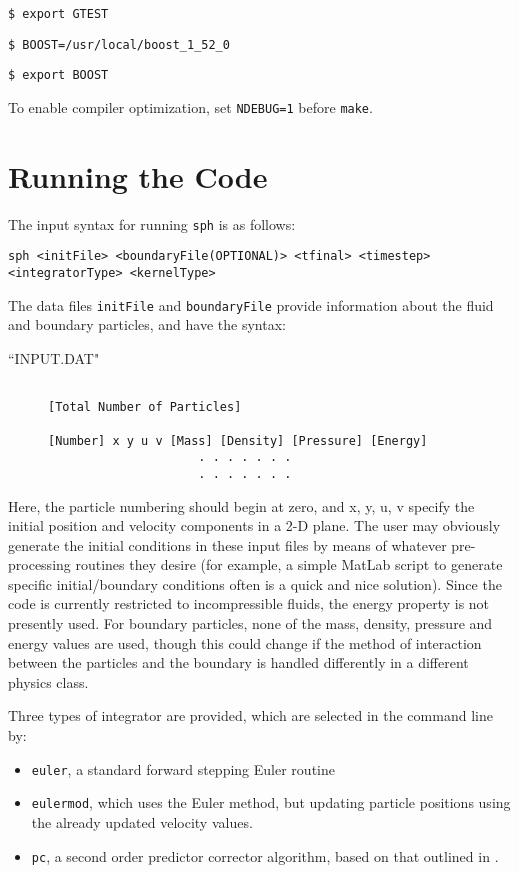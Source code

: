 \documentclass[12pt]{article}
\begin{document}
\texttt{\$  export GTEST}
  
\texttt{\$  BOOST=/usr/local/boost\_1\_52\_0}

\texttt{\$ export BOOST}

\noindent
To enable compiler optimization, set \texttt{NDEBUG=1} before \texttt{make}.


\section{Running the Code}

The input syntax for running \texttt{sph} is as follows:

\begin{center} \texttt{sph <initFile> <boundaryFile(OPTIONAL)> <tfinal> <timestep> <integratorType> <kernelType>} \end{center}
The data files \texttt{initFile} and \texttt{boundaryFile} provide information about the fluid and boundary particles, and have the syntax:
%
\begin{description}
	\item[``INPUT.DAT"]
		\begin{verbatim}

[Total Number of Particles]

[Number] x y u v [Mass] [Density] [Pressure] [Energy]
                     . . . . . . .
                     . . . . . . .
		\end{verbatim}
\end{description}
 
Here, the particle numbering should begin at zero, and {x, y, u, v} specify the initial position and velocity components in a 2-D plane. The user may obviously generate the initial conditions in these input files by means of whatever pre-processing routines they desire (for example, a simple MatLab script to generate specific initial/boundary conditions often is a quick and nice solution). Since the code is currently restricted to incompressible fluids, the energy property is not presently used. For boundary particles, none of the mass, density, pressure and energy values are used, though this could change if the method of interaction between the particles and the boundary is handled differently in a different physics class.

Three types of integrator are provided, which are selected in the command line by:
\begin{itemize}
\item \texttt{euler}, a standard forward stepping Euler routine
\item \texttt{eulermod}, which uses the Euler method, but updating particle positions using the already
updated velocity values.
\item \texttt{pc}, a second order predictor corrector algorithm, based on that outlined in \cite{Price04}.
\end{itemize}
\end{document}
